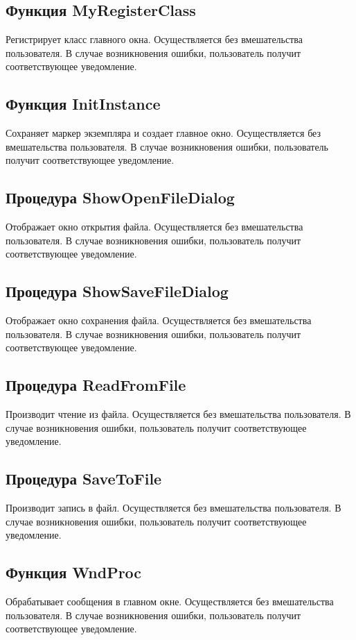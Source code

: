 \documentclass[14pt,a4paper,final]{extreport}
\begin{document}
\subsection{Функция MyRegisterClass}
Регистрирует класс главного окна. Осуществляется без вмешательства пользователя. 
В случае возникновения ошибки, пользователь получит соответствующее уведомление.

\subsection{Функция InitInstance}
Сохраняет маркер экземпляра и создает главное окно. Осуществляется без вмешательства пользователя. 
В случае возникновения ошибки, пользователь получит соответствующее уведомление.

\subsection{Процедура ShowOpenFileDialog}
Отображает окно открытия файла. Осуществляется без вмешательства пользователя. 
В случае возникновения ошибки, пользователь получит соответствующее уведомление.

\subsection{Процедура ShowSaveFileDialog}
Отображает окно сохранения файла. Осуществляется без вмешательства пользователя. 
В случае возникновения ошибки, пользователь получит соответствующее уведомление.

\subsection{Процедура ReadFromFile}
Производит чтение из файла. Осуществляется без вмешательства пользователя. 
В случае возникновения ошибки, пользователь получит соответствующее уведомление.

\subsection{Процедура SaveToFile}
Производит запись в файл.  Осуществляется без вмешательства пользователя. 
В случае возникновения ошибки, пользователь получит соответствующее уведомление.

\subsection{Функция WndProc}
Обрабатывает сообщения в главном окне. Осуществляется без вмешательства пользователя. 
В случае возникновения ошибки, пользователь получит соответствующее уведомление.
\end{document}
